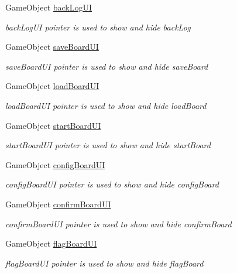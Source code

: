\begin{DoxyCompactItemize}
Game\+Object \hyperlink{class_world_control_ab49f9b8f28feb542edd927984c32ac1c}{back\+Log\+UI}
\begin{DoxyCompactList}\small\item\em back\+Log\+UI pointer is used to show and hide back\+Log \end{DoxyCompactList}\item 
Game\+Object \hyperlink{class_world_control_a360d0b5243a0e9e56e4ad31944e67c0e}{save\+Board\+UI}
\begin{DoxyCompactList}\small\item\em save\+Board\+UI pointer is used to show and hide save\+Board \end{DoxyCompactList}\item 
Game\+Object \hyperlink{class_world_control_a8bda427ef163decb5417991038f3c0ee}{load\+Board\+UI}
\begin{DoxyCompactList}\small\item\em load\+Board\+UI pointer is used to show and hide load\+Board \end{DoxyCompactList}\item 
Game\+Object \hyperlink{class_world_control_a4430b205ccaccd23d2812722a9b681b8}{start\+Board\+UI}
\begin{DoxyCompactList}\small\item\em start\+Board\+UI pointer is used to show and hide start\+Board \end{DoxyCompactList}\item 
Game\+Object \hyperlink{class_world_control_a8379797a66eb1e448b3e47f4584b70c4}{config\+Board\+UI}
\begin{DoxyCompactList}\small\item\em config\+Board\+UI pointer is used to show and hide config\+Board \end{DoxyCompactList}\item 
Game\+Object \hyperlink{class_world_control_a0feda681f4f39a069968cc36cd34f84e}{confirm\+Board\+UI}
\begin{DoxyCompactList}\small\item\em confirm\+Board\+UI pointer is used to show and hide confirm\+Board \end{DoxyCompactList}\item 
Game\+Object \hyperlink{class_world_control_a3a5cb853f246f79c03ae105529601cb0}{flag\+Board\+UI}
\begin{DoxyCompactList}\small\item\em flag\+Board\+UI pointer is used to show and hide flag\+Board \end{DoxyCompactList}\item 

\end{DoxyCompactItemize}
